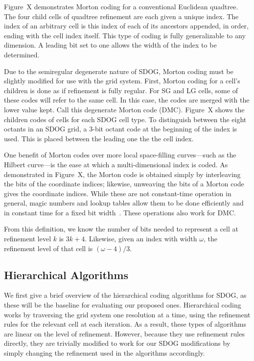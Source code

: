 Figure~X demonstrates Morton coding for a conventional Euclidean quadtree.
The four child cells of quadtree refinement are each given a unique index.
The index of an arbitrary cell is this index of each of its ancestors appended, in order, ending with the cell index itself.
This type of coding is fully generalizable to any dimension.
A leading bit set to one allows the width of the index to be determined.

Due to the semiregular degenerate nature of SDOG, Morton coding must be slightly modified for use with the grid system.
First, Morton coding for a cell's children is done as if refinement is fully regular.
For SG and LG cells, some of these codes will refer to the same cell.
In this case, the codes are merged with the lower value kept.
Call this degenerate Morton code (DMC).
Figure~X shows the children codes of cells for each SDOG cell type.
To distinguish between the eight octants in an SDOG grid, a 3-bit octant code at the beginning of the index is used.
This is placed between the leading one the the cell index.


One benefit of Morton codes over more local space-filling curves---such as the Hilbert curve---is the ease at which a multi-dimensional index is coded.
As demonstrated in Figure~X, the Morton code is obtained simply by interleaving the bits of the coordinate indices; likewise, unweaving the bits of a Morton code gives the coordinate indices.
While these are not constant-time operation in general, magic numbers and lookup tables allow them to be done efficiently and in constant time for a fixed bit width~\cite{bit twiddle, libmorton}.
These operations also work for DMC.


From this definition, we know the number of bits needed to represent a cell at refinement level $k$ is $3k + 4$.
Likewise, given an index with width $\omega$, the refinement level of that cell is $(\omega - 4) / 3$.


\subsection{Hierarchical Algorithms}
We first give a brief overview of the hierarchical coding algorithms for SDOG, as these will be the baseline for evaluating our proposed ones.
Hierarchical coding works by traversing the grid system one resolution at a time, using the refinement rules for the relevant cell at each iteration.
As a result, these types of algorithms are linear on the level of refinement.
However, because they use refinement rules directly, they are trivially modified to work for our SDOG modifications by simply changing the refinement used in the algorithms accordingly.


